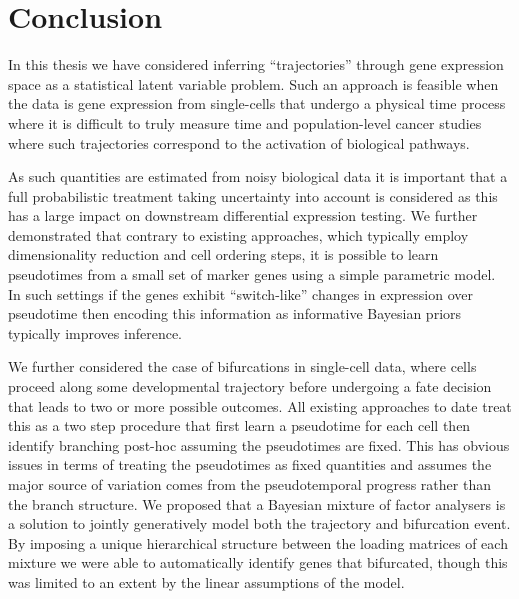 \chapter{Conclusion}\label{ch:conclusionchap} %

In this thesis we have considered inferring ``trajectories'' through gene expression space as a statistical latent variable problem. Such an approach is feasible when the data is gene expression from single-cells that undergo a physical time process where it is difficult to truly measure time and population-level cancer studies where such trajectories correspond to the activation of biological pathways. 

As such quantities are estimated from noisy biological data it is important that a full probabilistic treatment taking uncertainty into account is considered as this has a large impact on downstream differential expression testing. We further demonstrated that contrary to existing approaches, which typically employ dimensionality reduction and cell ordering steps, it is possible to learn pseudotimes from a small set of marker genes using a simple parametric model. In such settings if the genes exhibit ``switch-like'' changes in expression over pseudotime then encoding this information as informative Bayesian priors typically improves inference.

We further considered the case of bifurcations in single-cell data, where cells proceed along some developmental trajectory before undergoing a fate decision that leads to two or more possible outcomes. All existing approaches to date treat this as a two step procedure that first learn a pseudotime for each cell then identify branching post-hoc assuming the pseudotimes are fixed. This has obvious issues in terms of treating the pseudotimes as fixed quantities and assumes the major source of variation comes from the pseudotemporal progress rather than the branch structure. We proposed that a Bayesian mixture of factor analysers is a solution to jointly generatively model both the trajectory and bifurcation event. By imposing a unique hierarchical structure between the loading matrices of each mixture we were able to automatically identify genes that bifurcated, though this was limited to an extent by the linear assumptions of the model.

